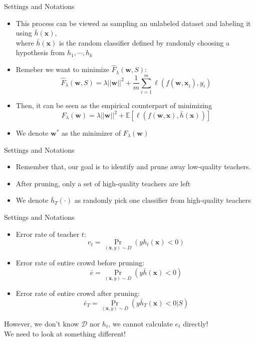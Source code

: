 \documentclass[10pt,table,mathserif]{beamer}
\begin{document}
\begin{frame}{Settings and Notations}
  \begin{itemize}
    \item This process can be viewed as sampling an unlabeled dataset and labeling it using \alert{$\bar{h}(\mathbf{x})$},\\ \pause
          where $\bar{h}(\mathbf{x})$ is the random classifier defined by randomly choosing a hypothesis from $h_1,\cdots,h_k$ \pause
    \item Remeber we want to minimize $\hat{F}_\lambda (\mathbf{w}, S)$:
        \[\hat{F}_{\lambda}(\mathbf{w}, S) = \lambda || \mathbf{w} ||^2 + \frac{1}{m}\sum^m_{i=1}\ell (f(\mathbf{w, x}_i), y_i)\] \pause
    \item Then, it can be seen as the empirical counterpart of minimizing
      \alert{\[F_\lambda (\mathbf{w}) = \lambda ||\mathbf{w}||^2 + \mathbb{E}\left[\ell (f(\mathbf{w,x}), \bar{h}(\mathbf{x}))\right]\]}
    \item We denote \alert{$\mathbf{w}^*$} as the minimizer of $F_{\lambda} (\mathbf{w})$
  \end{itemize}
\end{frame}

\begin{frame}{Settings and Notations}
  \begin{itemize}
    \item Remember that, our goal is to identify and prune away low-quality teachers. \pause
    \item After pruning, only a set of high-quality teachers are left \pause
    \item We denote \alert{$\bar{h}_T(\cdot)$} as randomly pick one classifier from high-quality teachers
  \end{itemize}
\end{frame}

\begin{frame}{Settings and Notations}
  \begin{itemize}
    \item Error rate of teacher $t$:
      \[e_t = \Pr_{(\mathbf{x}, y) \sim D}(y h_t (\mathbf{x})<0)\] \pause
    \item Error rate of entire crowd before pruning:
      \[\bar{e} = \Pr_{(\mathbf{x}, y) \sim D}(y \bar{h} (\mathbf{x})<0)\] \pause
    \item Error rate of entire crowd after pruning:
      \[\bar{e}_T  = \Pr_{(\mathbf{x}, y) \sim D}(y \bar{h}_T (\mathbf{x})<0 | S)\] \pause
  \end{itemize}
  However, we don't know $\mathcal{D}$ nor $h_t$, we cannot calculate $e_t$ directly!\\ \pause
  We need to look at something different!
\end{frame}
\end{document}
